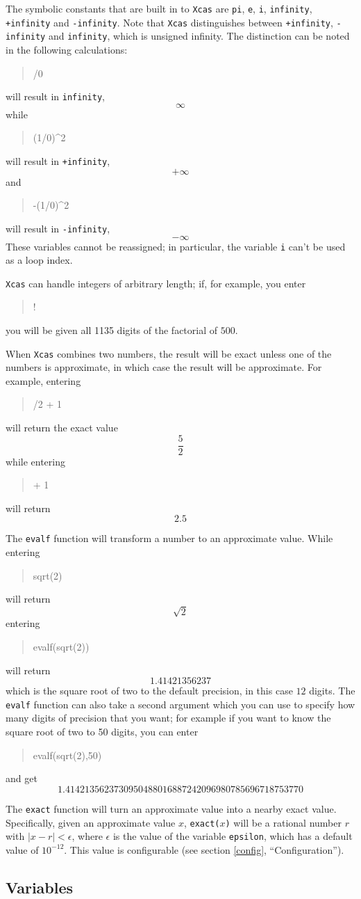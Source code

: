 \documentclass{article}
\newcommand{\xcasin}[1]
{\begin{quote}\ttfamily
#1
\end{quote}}
\newcommand{\xcasout}[1]
{\begin{equation*}
#1
\end{equation*}}
\begin{document}
The symbolic constants that are built in to \texttt{Xcas} are
\texttt{pi}, \texttt{e}, \texttt{i}, \texttt{infinity},
\texttt{+infinity} and \texttt{-infinity}.
Note that \texttt{Xcas} distinguishes between \texttt{+infinity},
\texttt{-infinity} and \texttt{infinity}, which is unsigned infinity.
The distinction can be noted in the following calculations:
\xcasin{1/0}
will result in \texttt{infinity},
\xcasout{\infty}
while
\xcasin{(1/0)\^{}2}
will result in \texttt{+infinity},
\xcasout{+\infty}
and
\xcasin{-(1/0)\^{}2}
will result in \texttt{-infinity},
\xcasout{-\infty}
These variables cannot be reassigned; in particular, the variable
\texttt{i} can't be used as a loop index.

\texttt{Xcas} can handle integers of arbitrary length; if, for
example, you enter
\xcasin{500!}
you will be given all 1135 digits of the factorial of $500$.

When \texttt{Xcas} combines two numbers, the result will be exact
unless one of the numbers is approximate, in which case the result
will be approximate.  For example, entering
\xcasin{3/2 + 1}
will return the exact value
\xcasout{\frac{5}{2}}
while entering
\xcasin{1.5 + 1}
will return
\xcasout{2.5}

The \texttt{evalf} function will
transform a number to an approximate value.  While entering
\xcasin{sqrt(2)}
will return
\xcasout{\sqrt{2}}
entering
\xcasin{evalf(sqrt(2))}
will return
\xcasout{1.41421356237}
which is the square root of two to the default precision, in this case
$12$ digits.  The \texttt{evalf} function can also take a second
argument which you can use to specify how many digits of precision
that you want; for example if you want to know the square root of two
to 50 digits, you can enter
\xcasin{evalf(sqrt(2),50)}
and get
\xcasout{1.4142135623730950488016887242096980785696718753770}

The \texttt{exact} function will turn 
an approximate value into a nearby
exact value.  Specifically, given an approximate value $x$,
\texttt{exact($x$)} will be a rational number $r$ with
$|x - r| < \epsilon$, where $\epsilon$ is the value of the variable
\texttt{epsilon}, which has a default value of $10^{-12}$.  This value
is configurable (see section \ref{config}, ``Configuration'').


\subsection{Variables}
\end{document}
